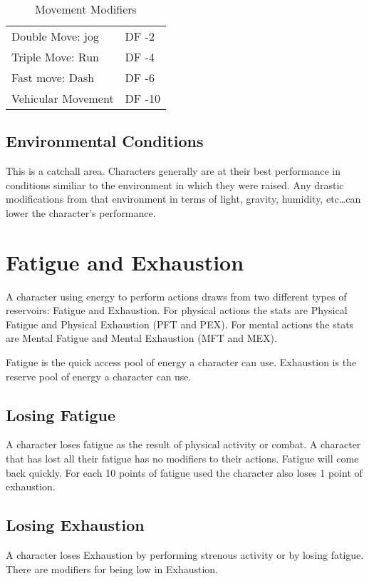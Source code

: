 \begin{table}[h]
	\begin{tabular}{ll}
	Double Move: jog							  & DF -2 \\
	Triple Move: Run							  & DF -4 \\
	Fast move: Dash							 & DF -6\\
	Vehicular Movement							& DF -10 \\ 
    \end{tabular}
    \caption{Movement Modifiers}
\end{table}

\subsection{Environmental Conditions}

This is a catchall area. Characters generally are at their best 
performance in conditions similiar to the environment in which they 
were raised. Any drastic modifications from that environment in 
terms of light, gravity, humidity, etc\dots can lower the character's 
performance.



\section{{Fatigue and Exhaustion}}

A character using energy to perform actions draws from two different 
types of reservoirs: Fatigue and Exhaustion. For physical actions the 
stats are Physical Fatigue and Physical Exhaustion (PFT and PEX). For mental
actions the stats are Mental Fatigue and Mental Exhaustion (MFT and MEX).

Fatigue is the quick access pool of energy a character can use.
Exhaustion is the reserve pool of energy a character can use. 

\subsection{Losing Fatigue}

A character loses fatigue as the result of physical activity or combat. 
A character that has lost all their fatigue has no modifiers to their actions.
Fatigue will come back quickly. For each 10 points of fatigue used the character 
also loses 1 point of exhaustion.

\subsection{Losing Exhaustion}
A character loses Exhaustion by performing strenous activity or by losing 
fatigue. There are modifiers for being low in Exhaustion.

